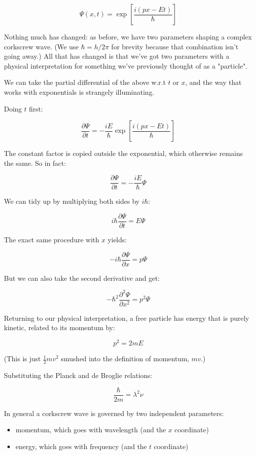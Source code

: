 $$
\Psi(x, t) = \exp \left[ {\frac{i(px - Et)}{\hbar}} \right]
$$

Nothing much has changed: as before, we have two parameters shaping a complex corkscrew wave. (We use $\hbar = h/2\pi$ for brevity because that combination isn't going away.) All that has changed is that we've got two parameters with a physical interpretation for something we've previously thought of as a "particle".

We can take the partial differential of the above w.r.t $t$ or $x$, and the way that works with exponentials is strangely illuminating.

Doing $t$ first:

$$
\frac{\partial \Psi}{\partial t}
=
-\frac{iE}{\hbar}
\exp \left[ {\frac{i(px - Et)}{\hbar}} \right]
$$

The constant factor is copied outside the exponential, which otherwise remains the same. So in fact:

$$
\frac{\partial \Psi}{\partial t}
=
-\frac{iE}{\hbar}
\Psi
$$

We can tidy up by multiplying both sides by $i\hbar$:

$$
i\hbar \frac{\partial \Psi}{\partial t}
= E \Psi
$$

The exact same procedure with $x$ yields:

$$
- i\hbar \frac{\partial \Psi}{\partial x}
= p \Psi
$$

But we can also take the second derivative and get:

$$
- \hbar^2 \frac{\partial^2 \Psi}{\partial x^2}
= p^2 \Psi
$$

Returning to our physical interpretation, a free particle has energy that is purely kinetic, related to its momentum by:

$$
p^2 = 2m E
$$

(This is just $\frac{1}{2}mv^2$ smushed into the definition of momentum, $mv$.)

Substituting the Planck and de Broglie relations:

$$
\frac{\hbar}{2m} = \lambda^2\nu
$$

In general a corkscrew wave is governed by two independent parameters:

\begin{itemize}
  \item momentum, which goes with wavelength (and the $x$ coordinate)
  \item energy, which goes with frequency (and the $t$ coordinate)
\end{itemize}

